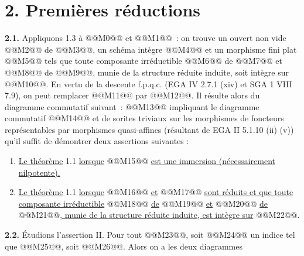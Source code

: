 
\section*{2. Premières réductions}

\textbf{2.1.} Appliquons 1.3 à @@M0@@ et @@M1@@~: on trouve un ouvert non vide @@M2@@ de @@M3@@, un schéma intègre @@M4@@ et un morphisme fini plat @@M5@@ tels que toute composante irréductible @@M6@@ de @@M7@@ et @@M8@@ de @@M9@@, munie de la structure réduite induite, soit intègre sur @@M10@@. En vertu de la descente f.p.q.c. (EGA IV 2.7.1 (xiv) et SGA 1 VIII 7.9), on peut remplacer @@M11@@ par @@M12@@. Il résulte alors du diagramme commutatif suivant~:
@@M13@@
impliquant le diagramme commutatif
@@M14@@
et de sorites triviaux sur les morphismes de foncteurs représentables par morphismes quasi-affines (résultant de EGA II 5.1.10 (ii) (v)) qu'il suffit de démontrer deux assertions suivantes :
\begin{enumerate}[label=\Roman*.]
\item \uline{Le théorème} 1.1 \uline{lorsque} @@M15@@ \uline{est une immersion (nécessairement nilpotente).}
\item \uline{Le théorème} 1.1 \uline{lorsque} @@M16@@ \uline{et} @@M17@@ \uline{sont réduits et que toute composante irréductible} @@M18@@ \uline{de} @@M19@@ \uline{et} @@M20@@ \uline{de} @@M21@@\uline{, munie de la structure réduite induite, est intègre sur} @@M22@@.
\end{enumerate}

\textbf{2.2.} Étudions l'assertion II. Pour tout @@M23@@, soit @@M24@@ un indice tel que @@M25@@, soit @@M26@@. Alors on a les deux diagrammes
